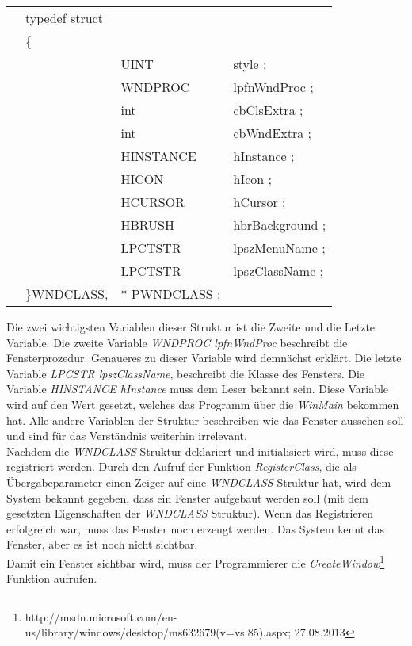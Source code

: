 \begin{tabular}{llll}
& typedef struct\\
& \{\\
& & UINT        & style ;\\
& & WNDPROC     & lpfnWndProc ;\\
& & int         & cbClsExtra ;\\
& & int         & cbWndExtra ;\\
& & HINSTANCE   & hInstance ;\\
& & HICON       & hIcon ;\\
& & HCURSOR     & hCursor ;\\
& & HBRUSH      & hbrBackground ;\\
& & LPCTSTR     & lpszMenuName ;\\
& & LPCTSTR     & lpszClassName ;\\
&\}WNDCLASS,&* PWNDCLASS ;
\end{tabular}

Die zwei wichtigsten Variablen dieser Struktur ist die Zweite und die Letzte Variable. Die zweite Variable \textit{WNDPROC lpfnWndProc} beschreibt die Fensterprozedur. Genaueres zu dieser Variable wird demnächst erklärt. Die letzte Variable \textit{LPCSTR lpszClassName}, beschreibt die Klasse des Fensters. Die Variable \textit{HINSTANCE hInstance} muss dem Leser bekannt sein. Diese Variable wird auf den Wert gesetzt, welches das Programm über die \textit{WinMain} bekommen hat. Alle andere Variablen der Struktur beschreiben wie das Fenster aussehen soll und sind für das Verständnis weiterhin irrelevant.
\\
Nachdem die \textit{WNDCLASS} Struktur deklariert und initialisiert wird, muss diese registriert werden. Durch den Aufruf der Funktion \textit{RegisterClass}, die als Übergabeparameter einen Zeiger auf eine \textit{WNDCLASS} Struktur hat, wird dem System bekannt gegeben, dass ein Fenster aufgebaut werden soll (mit dem gesetzten Eigenschaften der \textit{WNDCLASS} Struktur). Wenn das Registrieren erfolgreich war, muss das Fenster noch erzeugt werden. Das System kennt das Fenster, aber es ist noch nicht sichtbar.\\

Damit ein Fenster sichtbar wird, muss der Programmierer die \textit{CreateWindow}\footnote{http://msdn.microsoft.com/en-us/library/windows/desktop/ms632679(v=vs.85).aspx; 27.08.2013} Funktion aufrufen. 



